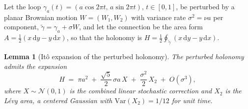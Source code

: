 \documentclass[11pt,a4paper]{article}
\theoremstyle{plain}
\newtheorem{lemma}[theorem]{Lemma}
\theoremstyle{definition}
\theoremstyle{remark}
\begin{document}
Let the loop $\gamma_a(t)=(a\cos 2\pi t,\,a\sin 2\pi t)$,
$t\in[0,1]$, be perturbed by a planar Brownian motion
$W=(W_1,W_2)$ with variance rate $\sigma^{2}=\nu a$ per component,
$\tilde\gamma=\gamma_a+\sigma W$, and let the connection be the
area form $A=\tfrac12(x\,\mathrm{d}y-y\,\mathrm{d}x)$, so that
the holonomy is $H=\tfrac12\oint_{\tilde\gamma}(x\,\mathrm{d}y-
y\,\mathrm{d}x)$.

\begin{lemma}[It\^o expansion of the perturbed holonomy]
\label{lem:ito-expand}
The perturbed holonomy admits the expansion
\begin{equation}\label{eq:H-expand}
  H \;=\; \pi a^{2} \;+\; \frac{\sqrt{5}}{2}\,\sigma a\,X
  \;+\; \frac{\sigma^{2}}{2}\,X_2 \;+\; O(\sigma^{3}),
\end{equation}
where $X\sim\mathcal N(0,1)$ is the combined linear stochastic
correction and $X_2$ is the L\'evy area, a centered Gaussian with
$\mathrm{Var}(X_2)=1/12$ for unit time.
\end{lemma}
\end{document}
